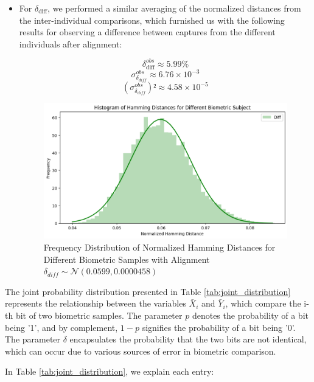 \begin{enumerate}
\begin{itemize}
        \item For \( \delta_{\text{diff}} \), we performed a similar averaging of the normalized distances from the inter-individual comparisons, which furnished us with the following results for observing a difference between captures from the different individuals after alignment:

        \[ \delta_{\text{diff}}^{obs} \approx 5.99\% \]
        \[ \sigma^{obs}_{\delta_{diff}} \approx 6.76 \times 10^{-3} \]
        \[ (\sigma^{obs}_{\delta_{diff}})² \approx 4.58 \times 10^{-5} \]

        \begin{figure}[H]
            \centering
            \includegraphics[width=0.7\linewidth]{latex-img/delta_diff.png}
            \caption{Frequency Distribution of Normalized Hamming Distances for Different Biometric Samples with Alignment \(\delta_{diff} \sim \mathcal{N}(0.0599, 0.0000458)\)}
            \label{delta_diff}
        \end{figure}
    \end{itemize}
\end{enumerate}

The joint probability distribution presented in Table \ref{tab:joint_distribution} represents the relationship between the variables \(\bar{X}_i\) and \(\bar{Y}_i\), which compare the i-th bit of two biometric samples. The parameter \(p\) denotes the probability of a bit being '1', and by complement, \(1-p\) signifies the probability of a bit being '0'. The parameter \(\delta\) encapsulates the probability that the two bits are not identical, which can occur due to various sources of error in biometric comparison. 

In Table \ref{tab:joint_distribution}, we explain each entry:

